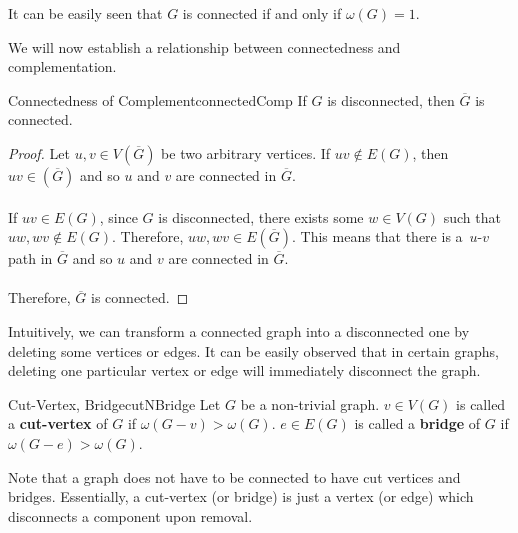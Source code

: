 \documentclass[math, code]{amznotes}
\theoremstyle{remark}
\begin{document}
It can be easily seen that $G$ is connected if and only if $\omega(G) = 1$.

We will now establish a relationship between connectedness and complementation.
\begin{thmbox}{Connectedness of Complement}{connectedComp}
    If $G$ is disconnected, then $\overline{G}$ is connected.
    \tcblower
    \begin{proof}
        Let $u, v \in V\left(\overline{G}\right)$ be two arbitrary vertices. If $uv \notin E(G)$, then $uv \in \left(\overline{G}\right)$ and so $u$ and $v$ are connected in $\overline{G}$.
        \\\\
        If $uv \in E(G)$, since $G$ is disconnected, there exists some $w \in V(G)$ such that~$uw, wv \notin E(G)$. Therefore, $uw, wv \in E\left(\overline{G}\right)$. This means that there is a~$u$-$v$ path in $\overline{G}$ and so $u$ and $v$ are connected in $\overline{G}$.
        \\\\
        Therefore, $\overline{G}$ is connected.
    \end{proof}
\end{thmbox}
Intuitively, we can transform a connected graph into a disconnected one by deleting some vertices or edges. It can be easily observed that in certain graphs, deleting one particular vertex or edge will immediately disconnect the graph.
\begin{dfnbox}{Cut-Vertex, Bridge}{cutNBridge}
    Let $G$ be a non-trivial graph. $v \in V(G)$ is called a {\color{red} \textbf{cut-vertex}} of $G$ if $\omega(G - v) > \omega(G)$. $e \in E(G)$ is called a {\color{red} \textbf{bridge}} of $G$ if $\omega(G - e) > \omega(G)$.
\end{dfnbox}
Note that a graph does not have to be connected to have cut vertices and bridges. Essentially, a cut-vertex (or bridge) is just a vertex (or edge) which disconnects a component upon removal.
\end{document}
